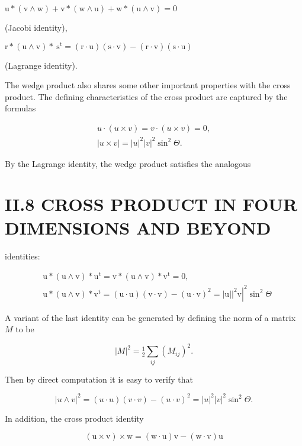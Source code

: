 \begin{CJK}{UTF8}{gbsn}
$\mathrm{u} *(\mathrm{v} \wedge \mathrm{w})+\mathrm{v} *(\mathrm{w} \wedge \mathrm{u})+\mathrm{w} *(\mathrm{u} \wedge \mathrm{v})=0$

(Jacobi identity),

$\mathrm{r} *(\mathrm{u} \wedge \mathrm{v}) * \mathrm{~s}^{\mathrm{t}}=(\mathrm{r} \cdot \mathrm{u})(\mathrm{s} \cdot \mathrm{v})-(\mathrm{r} \cdot \mathrm{v})(\mathrm{s} \cdot \mathrm{u})$

(Lagrange identity).

The wedge product also shares some other important properties with the cross product. The defining characteristics of the cross product are captured by the formulas

$$
\begin{gathered}
u \cdot(u \times v)=v \cdot(u \times v)=0, \\
|u \times v|=|u|^{2}|v|^{2} \sin ^{2} \Theta .
\end{gathered}
$$

By the Lagrange identity, the wedge product satisfies the analogous

\section{II.8 CROSS PRODUCT IN FOUR DIMENSIONS AND BEYOND}
identities:

$$
\begin{aligned}
&\mathrm{u} *(\mathrm{u} \wedge \mathrm{v}) * \mathrm{u}^{\mathrm{t}}=\mathrm{v} *(\mathrm{u} \wedge \mathrm{v}) * \mathrm{v}^{\mathrm{t}}=0, \\
&\mathrm{u} *(\mathrm{u} \wedge \mathrm{v}) * \mathrm{v}^{\mathrm{t}}=(\mathrm{u} \cdot \mathrm{u})(\mathrm{v} \cdot \mathrm{v})-(\mathrm{u} \cdot \mathrm{v})^{2}=\left.\left.|\mathrm{u}|\right|^{2} \mathrm{v}\right|^{2} \sin ^{2} \Theta
\end{aligned}
$$

A variant of the last identity can be generated by defining the norm of a matrix $M$ to be

$$
|M|^{2}={ }_{2}^{1} \sum_{i j}\left(M_{i j}\right)^{2} .
$$

Then by direct computation it is easy to verify that

$$
|u \wedge v|^{2}=(u \cdot u)(v \cdot v)-(u \cdot v)^{2}=|u|^{2}|v|^{2} \sin ^{2} \Theta .
$$

In addition, the cross product identity

$$
(\mathrm{u} \times \mathrm{v}) \times \mathrm{w}=(\mathrm{w} \cdot \mathrm{u}) \mathrm{v}-(\mathrm{w} \cdot \mathrm{v}) \mathrm{u}
$$


\end{CJK}
